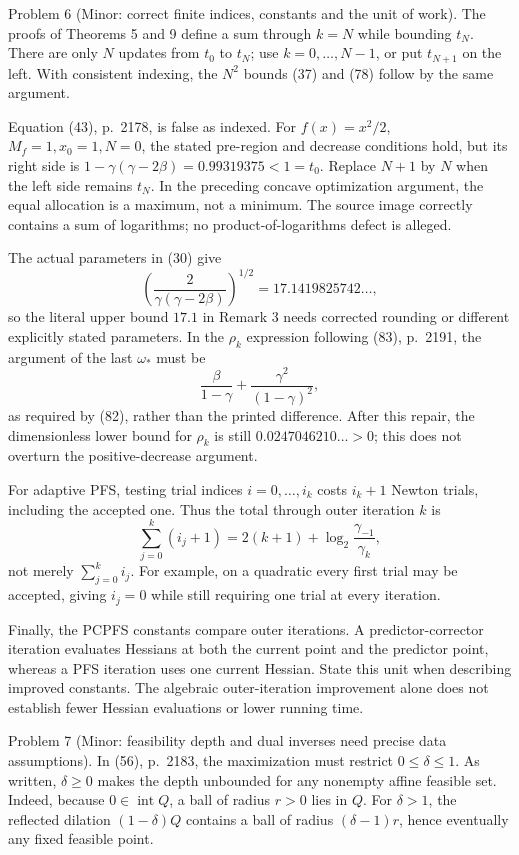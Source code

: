 \documentclass[10pt]{article}
\begin{document}
Problem 6 (Minor: correct finite indices, constants and the unit of work).  The proofs of Theorems 5 and 9 define a sum through \(k=N\) while bounding \(t_N\). There are only \(N\) updates from \(t_0\) to \(t_N\); use \(k=0,\ldots,N-1\), or put \(t_{N+1}\) on the left. With consistent indexing, the \(N^2\) bounds (37) and (78) follow by the same argument.\par
Equation (43), p. 2178, is false as indexed. For \(f(x)=x^2/2\), \(M_f=1,x_0=1,N=0\), the stated pre-region and decrease conditions hold, but its right side is \(1-\gamma(\gamma-2\beta)=0.99319375<1=t_0\). Replace \(N+1\) by \(N\) when the left side remains \(t_N\). In the preceding concave optimization argument, the equal allocation is a maximum, not a minimum. The source image correctly contains a sum of logarithms; no product-of-logarithms defect is alleged.\par
The actual parameters in (30) give \[\left(\frac{2}{\gamma(\gamma-2\beta)}\right)^{1/2}
 =17.1419825742\ldots,\] so the literal upper bound \(17.1\) in Remark 3 needs corrected rounding or different explicitly stated parameters. In the \(\rho_k\) expression following (83), p. 2191, the argument of the last \(\omega_\ast\) must be \[\frac{\beta}{1-\gamma}+\frac{\gamma^2}{(1-\gamma)^2},\] as required by (82), rather than the printed difference. After this repair, the dimensionless lower bound for \(\rho_k\) is still \(0.0247046210\ldots>0\); this does not overturn the positive-decrease argument.\par
For adaptive PFS, testing trial indices \(i=0,\ldots,i_k\) costs \(i_k+1\) Newton trials, including the accepted one. Thus the total through outer iteration \(k\) is \[\sum_{j=0}^{k}(i_j+1)
 =2(k+1)+\log_2\frac{\gamma_{-1}}{\gamma_k},\] not merely \(\sum_{j=0}^{k}i_j\). For example, on a quadratic every first trial may be accepted, giving \(i_j=0\) while still requiring one trial at every iteration.\par
Finally, the PCPFS constants compare outer iterations. A predictor-corrector iteration evaluates Hessians at both the current point and the predictor point, whereas a PFS iteration uses one current Hessian. State this unit when describing improved constants. The algebraic outer-iteration improvement alone does not establish fewer Hessian evaluations or lower running time.\par
Problem 7 (Minor: feasibility depth and dual inverses need precise data assumptions).  In (56), p. 2183, the maximization must restrict \(0\leq\delta\leq1\). As written, \(\delta\geq0\) makes the depth unbounded for any nonempty affine feasible set. Indeed, because \(0\in\operatorname{int}Q\), a ball of radius \(r>0\) lies in \(Q\). For \(\delta>1\), the reflected dilation \((1-\delta)Q\) contains a ball of radius \((\delta-1)r\), hence eventually any fixed feasible point.\par
\end{document}
